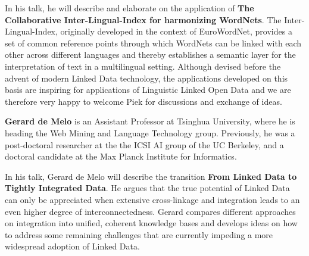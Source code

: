 In his talk, he will describe and elaborate on the application of \textbf{The Collaborative Inter-Lingual-Index for harmonizing WordNets}. 
The Inter-Lingual-Index, originally developed in the context of EuroWordNet, provides a set of common reference points through which WordNets can be linked with each other across different languages and thereby establishes a semantic layer for the interpretation of text in a multilingual setting. Although devised before the advent of modern Linked Data technology, the applications developed on this basis are inspiring for applications of Linguistic Linked Open Data and we are therefore very happy to welcome Piek for discussions and exchange of ideas.


\smallskip

\textbf{Gerard de Melo} is an Assistant Professor at Tsinghua
 University, where he is heading the Web Mining and Language Technology
 group. Previously, he was a post-doctoral researcher at the the ICSI AI group of the UC Berkeley, and a doctoral candidate at the Max Planck
 Institute for Informatics.

In his talk, Gerard de Melo will describe the transition \textbf{From Linked Data to Tightly Integrated Data}. 
He argues that the true potential of Linked Data can only be appreciated when extensive cross-linkage and integration leads to an even higher degree of interconnectedness. Gerard compares different approaches on integration into unified, coherent knowledge bases and develops ideas on how to address some remaining challenges that are currently
 impeding a more widespread adoption of Linked Data. 
